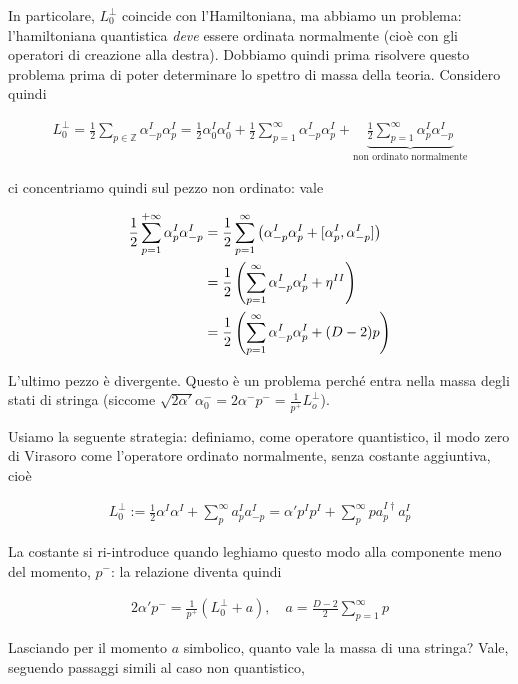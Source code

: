 \documentclass{report}
\begin{document}
In particolare, \(L_0^\perp\) coincide con l'Hamiltoniana, ma abbiamo un problema: l'hamiltoniana quantistica \emph{deve} essere ordinata normalmente (cioè con gli operatori di creazione alla destra). Dobbiamo quindi prima risolvere questo problema prima di poter determinare lo spettro di massa della teoria. Considero quindi 

\begin{align}
    L_0^\perp = \frac{1}{2}\sum_{p \in \mathbb{Z}}\alpha^I_{-p}\alpha^I_p = \frac{1}{2}\alpha_0^I \alpha_0^I + \frac{1}{2}\sum_{p=1}^\infty \alpha_{-p}^I\alpha_p^I + \underbrace{\frac{1}{2}\sum_{p=1}^{\infty}\alpha_p^I \alpha_{-p}^I}_{\text{non ordinato normalmente}}
\end{align}

ci concentriamo quindi sul pezzo non ordinato: vale 

\begin{align}
    \frac{1}{2}\sum_{p=1}^{+\infty}\alpha_p^I \alpha_{-p}^I &= \frac{1}{2}\sum_{p=1}^\infty \left(\alpha_{-p}^I \alpha^I_p + [\alpha_p^I, \alpha_{-p}^I] \right) \notag \\
    &= \frac{1}{2}\left(\sum_{p=1}^\infty \alpha_{-p}^I \alpha_p^I + \eta^{II} \right) \notag \\
    &= \frac{1}{2}\left(\sum_{p=1}^\infty \alpha_{-p}^I \alpha_p^I + (D-2)p \right)
\end{align}

L'ultimo pezzo è divergente. Questo è un problema perché entra nella massa degli stati di stringa (siccome \(\sqrt{2\alpha'}\alpha_0^- = 2\alpha^- p^- = \frac{1}{p^+}L_o^\perp\)). 

Usiamo la seguente strategia: definiamo, come operatore quantistico, il modo zero di Virasoro come l'operatore ordinato normalmente, senza costante aggiuntiva, cioè 

\begin{align}
    L_0^\perp := \frac{1}{2}\alpha^I \alpha^I + \sum_p^\infty a_p^I a_{-p}^I = \alpha' p^I p^I + \sum_p^\infty p a_p^{I\dagger}a_p^I 
\end{align}

La costante si ri-introduce quando leghiamo questo modo alla componente meno del momento, \(p^-\): la relazione diventa quindi 

\begin{align}
    2\alpha' p^- = \frac{1}{p^+}(L_0^\perp + a), \quad a = \frac{D-2}{2}\sum_{p=1}^{\infty}p 
\end{align}

Lasciando per il momento \(a\) simbolico, quanto vale la massa di una stringa? Vale, seguendo passaggi simili al caso non quantistico, 
\end{document}

